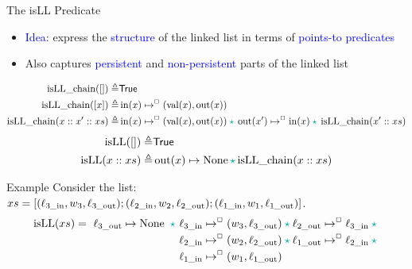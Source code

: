 \documentclass[9pt,xcolor={dvipsnames}]{beamer}
\newcommand{\xsc}{xs}
\newcommand{\isLLchain}{\operatorname{isLL\_chain}}
\newcommand{\isLL}{\operatorname{isLL}}
\newcommand{\locinM}[1]{\loc_{#1\_\mathrm{in}}}
\newcommand{\locoutM}[1]{\loc_{#1\_\mathrm{out}}}
\newcommand{\nodeval}{\valB}
\newcommand{\nodevalM}[1]{\nodeval_{#1}}
\newcommand{\nIn}[1]{\operatorname{in}(#1)}
\newcommand{\nVal}[1]{\operatorname{val}(#1)}
\newcommand{\nOut}[1]{\operatorname{out}(#1)}
\newcommand{\node}{x}
\newcommand{\isNode}[1]{\nIn{#1} \mapsto^{\persistently} (\nVal{#1}, \nOut{#1})}
\let\oldstar\star
\renewcommand{\star}{\begingroup \color{Emerald} \oldstar \endgroup}
\begin{document}
\begin{frame}{The isLL Predicate}
  \begin{itemize}
    \item \textcolor{blue}{Idea}: express the \textcolor{blue}{structure} of the linked list in terms of \textcolor{blue}{points-to predicates}
    \item Also captures \textcolor{blue}{persistent} and \textcolor{blue}{non-persistent} parts of the linked list
  \end{itemize}
  \begin{definition}
    \setlength\abovedisplayskip{-2pt}
    \setlength\belowdisplayskip{2pt}
    \fontsize{7pt}{4pt}\selectfont
    \begin{align*}
      \isLLchain([]) \eqdef& \TRUE\\
      \isLLchain([\node]) \eqdef& \isNode{\node}\\
      \isLLchain(\node :: \node' :: \xsc) \eqdef& \isNode{\node} \star{} \nOut{\node'} \mapsto^{\persistently} \nIn{\node} \star{} \isLLchain(\node' :: \xsc)
    \end{align*}
    \hrulefill
    \setlength\abovedisplayskip{2pt}
    \begin{align*}
      \isLL([]) \eqdef& \TRUE\\
      \isLL(\node :: \xsc) \eqdef& \nOut{\node} \mapsto \None \star{} \isLLchain(\node :: \xsc)
    \end{align*}
  \end{definition}
  \begin{exampleblock}{Example}
    \setlength\abovedisplayskip{6pt}
    \setlength\belowdisplayskip{6pt}
    \fontsize{8pt}{4pt}\selectfont
    Consider the list: $\xsc = [(\locinM{3}, \nodevalM{3}, \locoutM{3}); (\locinM{2}, \nodevalM{2}, \locoutM{2});  (\locinM{1}, \nodevalM{1}, \locoutM{1})]$.
    \begin{align*}
      \isLL(\xsc) = \ \locoutM{3} \mapsto \None \ \star{} \
      &\locinM{3} \mapsto^{\persistently} (\nodevalM{3}, \locoutM{3}) \star{} \locoutM{2}	\mapsto^{\persistently} \locinM{3}\star{}\\
      &\locinM{2} \mapsto^{\persistently} (\nodevalM{2}, \locoutM{2}) \star{} \locoutM{1}\mapsto^{\persistently} \locinM{2} \star{}\\
      &\locinM{1} \mapsto^{\persistently} (\nodevalM{1}, \locoutM{1})
    \end{align*}
    \begin{center}

\end{center}
\end{exampleblock}
\end{frame}
\end{document}
